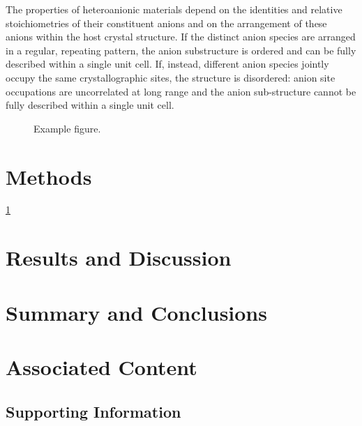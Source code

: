 \documentclass[aps,prmaterials,twocolumn,superscriptaddress,reprint,citeautoscript]{revtex4-2}
\begin{document}
The properties of heteroanionic materials depend on the identities and relative stoichiometries of their constituent anions and on the arrangement of these anions within the host crystal structure.
If the distinct anion species are arranged in a regular, repeating pattern, the anion substructure is ordered and can be fully described within a single unit cell.
If, instead, different anion species jointly occupy the same crystallographic sites, the structure is disordered: anion site occupations are uncorrelated at long range and the anion sub-structure cannot be fully described within a single unit cell.

\begin{figure}[htb!]
  \centering
  \caption{\label{fig:example_figure}Example figure.}
\end{figure}

\section{Methods}
\cref{fig:example_figure}

\section{Results and Discussion}

\section{Summary and Conclusions}

\section{Associated Content}
\subsection{Supporting Information}
\end{document}
